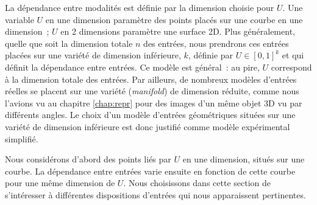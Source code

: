 \documentclass[../main]{subfiles}
\begin{document}
La dépendance entre modalités est définie par la dimension choisie pour $U$.
Une variable $U$ en une dimension paramètre des points placés sur une courbe en une dimension~; $U$ en 2 dimensions paramètre une surface 2D. 
Plus généralement, quelle que soit la dimension totale $n$ des entrées, nous prendrons ces entrées placées sur une variété de dimension inférieure, $k$,  définie par $U \in [0,1]^k$ et qui définit la dépendance entre entrées. 
Ce modèle est général~: au pire, $U$ correspond à la dimension totale des entrées. Par ailleurs, de nombreux modèles d'entrées réelles se placent sur une variété (\emph{manifold}) de dimension réduite, comme nous l'avions vu au chapitre \ref{chap:repr} pour des images d'un même objet 3D vu par différents angles. 
Le choix d'un modèle d'entrées géométriques situées sur une variété de dimension inférieure est donc justifié comme modèle expérimental simplifié.

Nous considérons d'abord des points liés par $U$ en une dimension, situés sur une courbe. 
La dépendance entre entrées varie ensuite en fonction de cette courbe pour une même dimension de $U$. Nous choisissons dans cette section de s'intéresser à différentes dispositions d'entrées qui nous apparaissent pertinentes.
\end{document}
